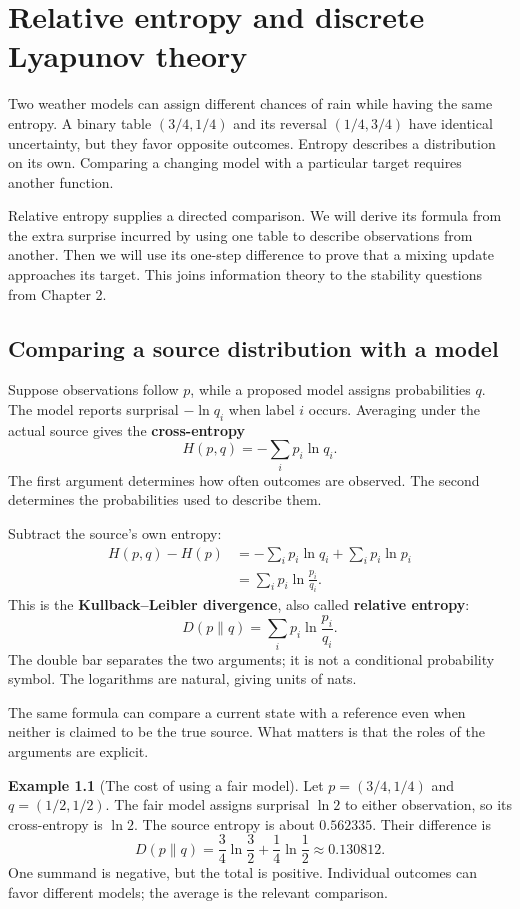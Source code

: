\documentclass[11pt,oneside,openany]{book}
\theoremstyle{definition}
\newtheorem{example}{Example}[chapter]
\theoremstyle{remark}
\numberwithin{equation}{chapter}
\begin{document}
\FloatBarrier

\chapter{Relative entropy and discrete Lyapunov theory}
Two weather models can assign different chances of rain while having the same entropy. A binary table \((3/4,1/4)\) and its reversal \((1/4,3/4)\) have identical uncertainty, but they favor opposite outcomes. Entropy describes a distribution on its own. Comparing a changing model with a particular target requires another function.

Relative entropy supplies a directed comparison. We will derive its formula from the extra surprise incurred by using one table to describe observations from another. Then we will use its one-step difference to prove that a mixing update approaches its target. This joins information theory to the stability questions from Chapter 2.

\section{Comparing a source distribution with a model}\label{ch06-comparing-a-source-distribution-with-a-model}

Suppose observations follow \(p\), while a proposed model assigns probabilities \(q\). The model reports surprisal \(-\ln q_i\) when label \(i\) occurs. Averaging under the actual source gives the \textbf{cross-entropy} \[H(p,q)=-\sum_i p_i\ln q_i.\] The first argument determines how often outcomes are observed. The second determines the probabilities used to describe them.

Subtract the source's own entropy: \[\begin{aligned}
H(p,q)-H(p)
&=-\sum_i p_i\ln q_i+\sum_i p_i\ln p_i\\
&=\sum_i p_i\ln\frac{p_i}{q_i}.
\end{aligned}\] This is the \textbf{Kullback--Leibler divergence}, also called \textbf{relative entropy}: \[\boxed{D(p\|q)=\sum_i p_i\ln\frac{p_i}{q_i}.}\] The double bar separates the two arguments; it is not a conditional probability symbol. The logarithms are natural, giving units of nats.

The same formula can compare a current state with a reference even when neither is claimed to be the true source. What matters is that the roles of the arguments are explicit.

\begin{example}[The cost of using a fair model]

Let \(p=(3/4,1/4)\) and \(q=(1/2,1/2)\). The fair model assigns surprisal \(\ln2\) to either observation, so its cross-entropy is \(\ln2\). The source entropy is about \(0.562335\). Their difference is \[D(p\|q)=\frac34\ln\frac32+\frac14\ln\frac12
\approx0.130812.\] One summand is negative, but the total is positive. Individual outcomes can favor different models; the average is the relevant comparison.

\end{example}
\end{document}
